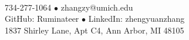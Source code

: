 \begin{center}
    \\
    \vspace{1ex}
    734-277-1064 $\bullet$ 
    zhangzy@umich.edu\\
    GitHub: Ruminateer $\bullet$ 
    LinkedIn: zhengyuanzhang\\
    1837 Shirley Lane, Apt C4, Ann Arbor, MI 48105
\end{center}